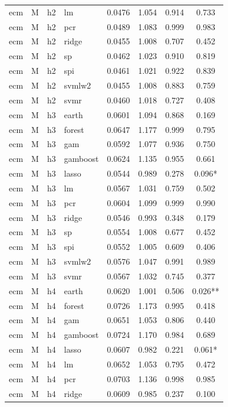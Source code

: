\begin{ThreePartTable}
\begin{longtable}[t]{llclcccc}
ecm & M & h2 & lm & 0.0476 & 1.054 & 0.914 & 0.733\\
ecm & M & h2 & pcr & 0.0489 & 1.083 & 0.999 & 0.983\\
ecm & M & h2 & ridge & 0.0455 & 1.008 & 0.707 & 0.452\\
ecm & M & h2 & sp & 0.0462 & 1.023 & 0.910 & 0.819\\
ecm & M & h2 & spi & 0.0461 & 1.021 & 0.922 & 0.839\\
ecm & M & h2 & svmlw2 & 0.0455 & 1.008 & 0.883 & 0.759\\
ecm & M & h2 & svmr & 0.0460 & 1.018 & 0.727 & 0.408\\
\addlinespace
ecm & M & h3 & earth & 0.0601 & 1.094 & 0.868 & 0.169\\
ecm & M & h3 & forest & 0.0647 & 1.177 & 0.999 & 0.795\\
ecm & M & h3 & gam & 0.0592 & 1.077 & 0.936 & 0.750\\
ecm & M & h3 & gamboost & 0.0624 & 1.135 & 0.955 & 0.661\\
ecm & M & h3 & lasso & 0.0544 & 0.989 & 0.278 & 0.096*\\
ecm & M & h3 & lm & 0.0567 & 1.031 & 0.759 & 0.502\\
ecm & M & h3 & pcr & 0.0604 & 1.099 & 0.999 & 0.990\\
ecm & M & h3 & ridge & 0.0546 & 0.993 & 0.348 & 0.179\\
ecm & M & h3 & sp & 0.0554 & 1.008 & 0.677 & 0.452\\
ecm & M & h3 & spi & 0.0552 & 1.005 & 0.609 & 0.406\\
ecm & M & h3 & svmlw2 & 0.0576 & 1.047 & 0.991 & 0.989\\
ecm & M & h3 & svmr & 0.0567 & 1.032 & 0.745 & 0.377\\
\addlinespace
ecm & M & h4 & earth & 0.0620 & 1.001 & 0.506 & 0.026**\\
ecm & M & h4 & forest & 0.0726 & 1.173 & 0.995 & 0.418\\
ecm & M & h4 & gam & 0.0651 & 1.053 & 0.806 & 0.440\\
ecm & M & h4 & gamboost & 0.0724 & 1.170 & 0.984 & 0.689\\
ecm & M & h4 & lasso & 0.0607 & 0.982 & 0.221 & 0.061*\\
ecm & M & h4 & lm & 0.0652 & 1.053 & 0.795 & 0.472\\
ecm & M & h4 & pcr & 0.0703 & 1.136 & 0.998 & 0.985\\
ecm & M & h4 & ridge & 0.0609 & 0.985 & 0.237 & 0.100\\

\end{longtable}
\end{ThreePartTable}
